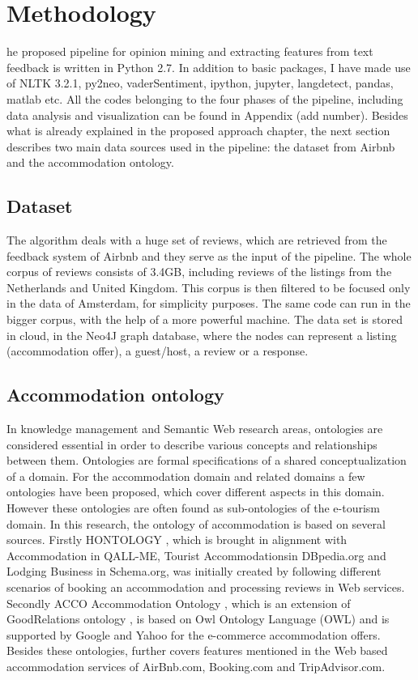 %
%
\let\textcircled=\pgftextcircled
\chapter{Methodology}
\label{chap:methods}

 he proposed pipeline for opinion mining and extracting features from text feedback is written in Python 2.7. In addition to basic packages, I have made use of NLTK 3.2.1, py2neo, vaderSentiment, ipython, jupyter, langdetect, pandas, matlab etc. All the codes belonging to the four phases of the pipeline, including data analysis and visualization can be found in Appendix (add number). Besides what is already explained in the proposed approach chapter, the next section describes two main data sources used in the pipeline: the dataset from Airbnb and the accommodation ontology.
\section{Dataset}
%
%
The algorithm deals with a huge set of reviews, which are retrieved from the feedback system of Airbnb and they serve as the input of the pipeline. The whole corpus of reviews consists of 3.4GB, including reviews of the listings from the Netherlands and United Kingdom. This corpus is then filtered to be focused only in the data of Amsterdam, for simplicity purposes. The same code can run in the bigger corpus, with the help of a more powerful machine. The data set is stored in cloud, in the Neo4J graph database, where the nodes can represent a listing (accommodation offer), a guest/host, a review or a response. 
%
%
\section{Accommodation ontology} 
In knowledge management and Semantic Web research areas, ontologies are considered essential in order to describe various concepts and relationships between them. Ontologies are formal specifications of a shared conceptualization of a domain. For the accommodation domain and related domains a few ontologies have been proposed, which cover different aspects in this domain. However these ontologies are often found as sub-ontologies of the e-tourism domain. In this research, the ontology of accommodation is based on several sources. Firstly HONTOLOGY \cite{chaves2012hontology}, which is brought in alignment with Accommodation in QALL-ME, Tourist Accommodationsin DBpedia.org and Lodging Business  in Schema.org, was initially created by following different scenarios of booking an accommodation and processing reviews in Web services. Secondly ACCO Accommodation Ontology \cite{hepp2013accommodation}, which is an extension of GoodRelations ontology \cite{hepp2008goodrelations}, is based on Owl Ontology Language (OWL) and is supported by Google and Yahoo for the e-commerce accommodation offers.
Besides these ontologies,  further covers features mentioned in the Web based accommodation services of AirBnb.com, Booking.com and TripAdvisor.com.

